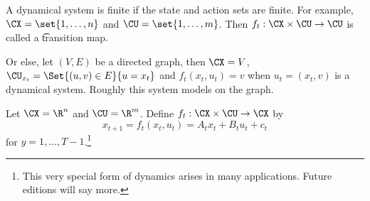 

A dynamical system is finite if the state and action sets are finite.
For example, $\CX = \set{1, \dots, n}$ and $\CU = \set{1, \dots, m}$.
Then $f_t: \CX \times \CU \to \CU$ is called a \t{transition map}.

Or else, let $(V, E)$ be a directed graph, then $\CX = V$, $\CU_{x_t} = \Set{(u, v) \in E}{u = x_t}$ and $f_t(x_t, u_t) = v$ when $u_t = (x_t, v)$ is a dynamical system.
Roughly this system models  on the graph.


Let $\CX = \R^n$ and $\CU = \R^m$.
Define $f_t: \CX \times \CU \to \CX$ by
\[
    x_{t+1} = f_t(x_t, u_t) = A_t x_t + B_t u_t + c_t
\]
for $y = 1, \dots, T-1$.\footnote{This very special form of dynamics arises in many applications. Future editions will say more.}
